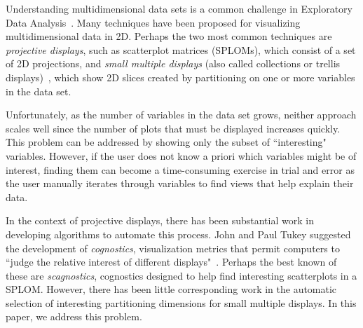 

Understanding multidimensional data sets is a common challenge in Exploratory Data Analysis~\cite{Tukey1977}. Many techniques have been proposed for visualizing multidimensional data in 2D. Perhaps the two most common techniques are \emph{projective displays}, such as scatterplot matrices (SPLOMs), which consist of a set of 2D projections, and \emph{small multiple displays} (also called collections or trellis displays)~\cite{Bertin1983, tufte1986, Becker1996}, which show 2D slices created by partitioning on one or more variables in the data set.

Unfortunately, as the number of variables in the data set grows, neither approach scales well since the number of plots that must be displayed increases quickly. This problem can be addressed by showing only the subset of ``interesting" variables. However, if the user does not know a priori which variables might be of interest, finding them can become a time-consuming exercise in trial and error as the user manually iterates through variables to find views that help explain their data. 

In the context of projective displays, there has been substantial work in developing algorithms to automate this process. John and Paul Tukey suggested the development of \emph{cognostics}, visualization metrics that permit computers to ``judge the relative interest of different displays"~\cite{Tukey1985}. Perhaps the best known of these are \emph{scagnostics}, cognostics designed to help find interesting scatterplots in a SPLOM.
However, there has been little corresponding work in the automatic selection of interesting partitioning dimensions for small multiple displays. In this paper, we address this problem.

